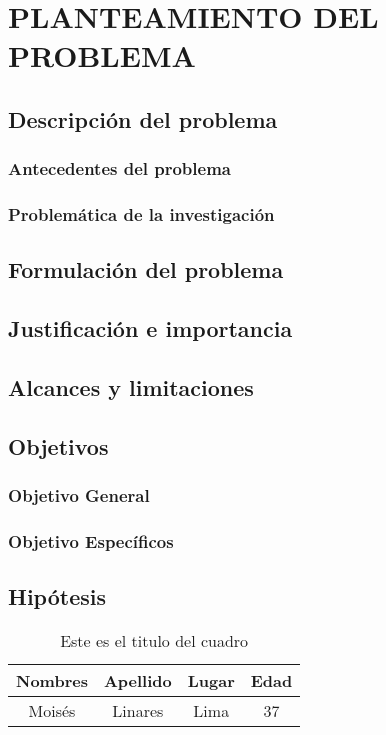 \chapter{PLANTEAMIENTO DEL PROBLEMA}
  \section{Descripción del problema}
    \subsection{Antecedentes del problema}
    \subsection{Problemática de la investigación}
  \section{Formulación del problema}
  \section{Justificación e importancia}
  \section{Alcances y limitaciones}
  \section{Objetivos}
    \subsection{Objetivo General}
    \subsection{Objetivo Específicos}
  \section{Hipótesis}
    \lipsum[2]
    \begin{table}[h]
        \centering
        \begin{tabular}{|c|c|c|c|}
        \hline
        Nombres & Apellido & Lugar & Edad \\
        \hline
             Moisés & Linares & Lima & 37 \\
        \hline
        \end{tabular}
        \caption{Este es el titulo del cuadro}
        \label{tab:Primara Tabla}
    \end{table} 